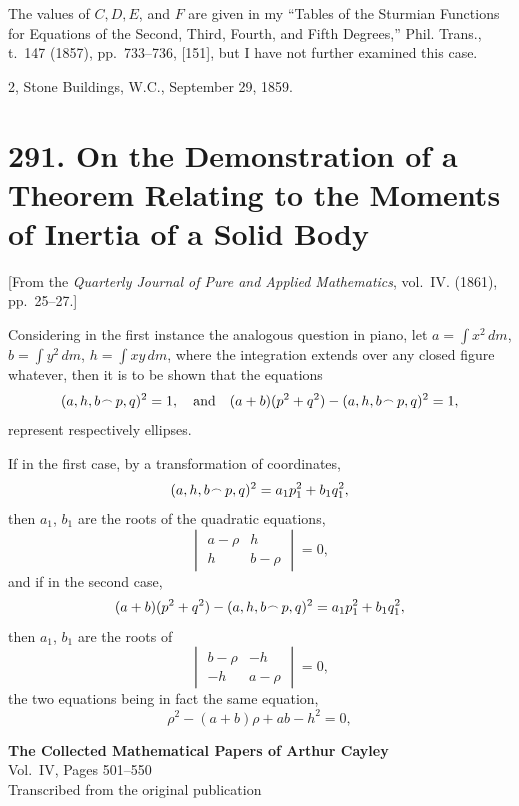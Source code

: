 \documentclass[11pt,a4paper]{book}
\begin{document}
The values of $C, D, E$, and $F$ are given in my ``Tables of the Sturmian Functions for Equations of the Second, Third, Fourth, and Fifth Degrees,'' Phil. Trans., t.~147 (1857), pp.~733--736, [151], but I have not further examined this case.

\hfill 2, Stone Buildings, W.C., September 29, 1859.


\newpage
\section*{291. On the Demonstration of a Theorem Relating to the Moments of Inertia of a Solid Body}
\label{sec:291}

[From the \textit{Quarterly Journal of Pure and Applied Mathematics}, vol.~IV. (1861), pp.~25--27.]

Considering in the first instance the analogous question in piano, let $a = \int x^2\,dm$, $b = \int y^2\,dm$, $h = \int xy\,dm$, where the integration extends over any closed figure whatever, then it is to be shown that the equations
\[
(a, h, b \mathbin{\vcenter{\hbox{$\scriptstyle\!\frown$}}} p, q)^2 = 1,\quad \text{and}\quad (a + b)(p^2 + q^2) - (a, h, b \mathbin{\vcenter{\hbox{$\scriptstyle\!\frown$}}} p, q)^2 = 1,
\]
represent respectively ellipses.

If in the first case, by a transformation of coordinates,
\[
(a, h, b \mathbin{\vcenter{\hbox{$\scriptstyle\!\frown$}}} p, q)^2 = a_1p_1^2 + b_1q_1^2,
\]
then $a_1$, $b_1$ are the roots of the quadratic equations,
\[
\begin{vmatrix}
a - \rho & h \\
h & b - \rho
\end{vmatrix} = 0,
\]
and if in the second case,
\[
(a + b)(p^2 + q^2) - (a, h, b \mathbin{\vcenter{\hbox{$\scriptstyle\!\frown$}}} p, q)^2 = a_1p_1^2 + b_1q_1^2,
\]
then $a_1$, $b_1$ are the roots of
\[
\begin{vmatrix}
b - \rho & -h \\
-h & a - \rho
\end{vmatrix} = 0,
\]
the two equations being in fact the same equation,
\[
\rho^2 - (a + b)\rho + ab - h^2 = 0,
\]
\clearpage


\begin{center}
{\Large\bfseries The Collected Mathematical Papers of Arthur Cayley}\\[6pt]
{\large Vol.~IV, Pages 501--550}\\[12pt]
{\small Transcribed from the original publication}
\end{center}
\end{document}

